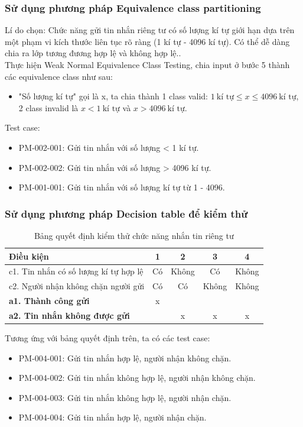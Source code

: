 \subsubsection{Sử dụng phương pháp Equivalence class partitioning}
Lí do chọn: Chức năng gửi tin nhắn riêng tư có số lượng kí tự giới hạn dựa trên một phạm vi kích thước liên tục rõ ràng (1 kí tự - 4096 kí tự). Có thể dễ dàng chia ra lớp tương đương hợp lệ và không hợp lệ.. \\
Thực hiện Weak Normal Equivalence Class Testing, chia input ở bước 5 thành các equivalence class như sau:
\begin{itemize}
    \item "Số lượng kí tự" gọi là x, ta chia thành 1 class valid: \(1\ \text{kí tự} \leq x \leq 4096\ \text{kí tự}\), 2 class invalid là \(x < 1\ \text{kí tự}\) và \(x > 4096\ \text{kí tự}\).
\end{itemize}
Test case:
\begin{itemize}
    \item PM-002-001: Gửi tin nhắn với số lượng < 1 kí tự.
    \item PM-002-002: Gửi tin nhắn với số lượng > 4096 kí tự.
    \item PM-001-001: Gửi tin nhắn với số lượng kí tự từ 1 - 4096.
\end{itemize}

\subsubsection{Sử dụng phương pháp Decision table để kiểm thử}

\begin{table}[H]
    \centering
    \begin{tabular}{|l|c|c|c|c|}
        \hline
        \textbf{Điều kiện} & \textbf{1} & \textbf{2} & \textbf{3} & \textbf{4} \\
        \hline
        c1. Tin nhắn có số lượng kí tự hợp lệ & Có & Không & Có & Không \\
        \hline
        c2. Người nhận không chặn người gửi & Có & Có & Không & Không \\\hline
        \textbf{a1. Thành công gửi} & x & & & \\
        \hline
        \textbf{a2. Tin nhắn không được gửi} & & x & x &x \\
        \hline
    \end{tabular}
    \caption{Bảng quyết định kiểm thử chức năng nhắn tin riêng tư}
    \label{tab:decision-table-private-message}
\end{table}
Tương ứng với bảng quyết định trên, ta có các test case:
\begin{itemize}
    \item PM-004-001: Gửi tin nhắn hợp lệ, người nhận không chặn.
    \item PM-004-002: Gửi tin nhắn không hợp lệ, người nhận không chặn.
    \item PM-004-003: Gửi tin nhắn không hợp lệ, người nhận chặn.
    \item PM-004-004: Gửi tin nhắn hợp lệ, người nhận chặn.
\end{itemize}
